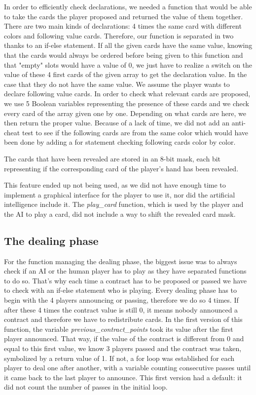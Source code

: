 \documentclass[12pt]{article}
\begin{document}
In order to efficiently check declarations, we needed a function that would be able to take the cards the player proposed and returned the value of them together. There are two main kinds of declarations: 4 times the same card with different colors and following value cards. Therefore, our function is separated in two thanks to an if-else statement. If all the given cards have the same value, knowing that the cards would always be ordered before being given to this function and that "empty" slots would have a value of 0, we just have to realize a switch on the value of these 4 first cards of the given array to get the declaration value. In the case that they do not have the same value. We assume the player wants to declare following value cards. In order to check what relevant cards are proposed, we use 5 Boolean variables representing the presence of these cards and we check every card of the array given one by one. Depending on what cards are here, we then return the proper value.
Because of a lack of time, we did not add an anti-cheat test to see if the following cards are from the same color which would have been done by adding a for statement checking following cards color by color.

The cards that have been revealed are stored in an 8-bit mask, each bit representing if the corresponding card of the player's hand has been revealed.

This feature ended up not being used, as we did not have enough time to implement a graphical interface for the player to use it, nor did the artificial intelligence include it.
The \textit{play\_card} function, which is used by the player and the AI to play a card, did not include a way to shift the revealed card mask.

\subsection{The dealing phase}

For the function managing the dealing phase, the biggest issue was to always check if an AI or the human player has to play as they have separated functions to do so.
That’s why each time a contract has to be proposed or passed we have to check with an if-else statement who is playing.
Every dealing phase has to begin with the 4 players announcing or passing, therefore we do so 4 times.
If after these 4 times the contract value is still 0, it means nobody announced a contract and therefore we have to redistribute cards.
In the first version of this function, the variable \textit{previous\_contract\_points} took its value after the first player announced.
That way, if the value of the contract is different from 0 and equal to this first value, we know 3 players passed and the contract was taken, symbolized by a return value of 1.
If not, a for loop was established for each player to deal one after another, with a variable counting consecutive passes until it came back to the last player to announce.
This first version had a default: it did not count the number of passes in the initial loop.
\end{document}
